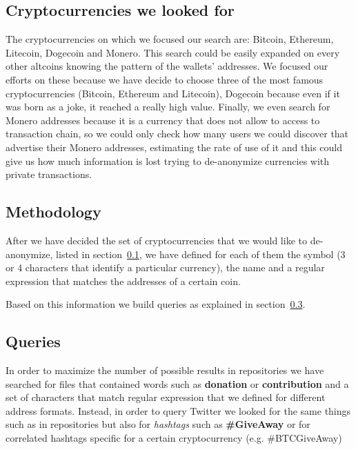 \subsection{Cryptocurrencies we looked for}
\label{subsec:currencies}
The cryptocurrencies on which we focused our search are: Bitcoin, Ethereum,
Litecoin, Dogecoin and Monero. This search could be easily expanded on every
other altcoins knowing the pattern of the wallets' addresses. We focused our
efforts on these because we have decide to choose three of the most famous
cryptocurrencies (Bitcoin, Ethereum and Litecoin), Dogecoin because even if
it was born as a joke, it reached a really high value. Finally, we even
search for Monero addresses because it is a currency that does not allow to
access to transaction chain, so we could only check how many users we could
discover that advertise their Monero addresses, estimating the rate of use of
it and this could give us how much information is lost trying to de-anonymize
currencies with private transactions.

\subsection{Methodology}
\label{sec:methodology}
After we have decided the set of cryptocurrencies that we would like to
de-anonymize, listed in section~\ref{subsec:currencies}, we have defined for
each of them the symbol (3 or 4 characters that identify a particular
currency), the name and a regular expression that matches the addresses of a
certain coin.

Based on this information we build queries as explained in
section~\ref{sec:queries}.

\subsection{Queries} 
\label{sec:queries}
In order to maximize the number of possible results in repositories we have
searched for files that contained words such as \textbf{donation} or
\textbf{contribution} and a set of characters that match regular expression
that we defined for different address formats. Instead, in order to query
Twitter we looked for the same things such as in repositories but also for
\textit{hashtags} such as \textbf{\#GiveAway} or for correlated hashtags
specific for a certain cryptocurrency (e.g. \#BTCGiveAway)


